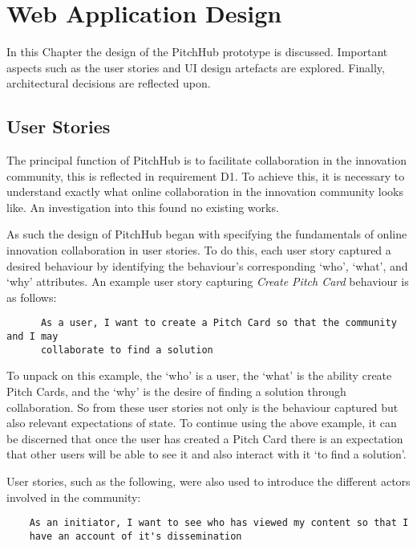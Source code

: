 
\chapter{Web Application Design}\label{C:design_web}

In this Chapter the design of the PitchHub prototype is discussed. Important aspects such as the user stories and UI design artefacts are explored. Finally, architectural decisions are reflected upon.

\section{User Stories}

The principal function of PitchHub is to facilitate collaboration in the innovation community, this is reflected in requirement D1. To achieve this, it is necessary to understand exactly what online collaboration in the innovation community looks like. An investigation into this found no existing works. 

As such the design of PitchHub began with specifying the fundamentals of online innovation collaboration in user stories. To do this, each user story captured a desired behaviour by identifying the behaviour's corresponding `who', `what', and `why' attributes. An example user story capturing \textit{Create Pitch Card} behaviour is as follows:

\begin{verbatim}
	  As a user, I want to create a Pitch Card so that the community and I may 
	  collaborate to find a solution	
\end{verbatim}

To unpack on this example, the `who' is a user, the `what' is the ability create Pitch Cards, and the `why' is the desire of finding a solution through collaboration.
So from these user stories not only is the behaviour captured but also relevant expectations of state. To continue using the above example, it can be discerned that once the user has created a Pitch Card there is an expectation that other users will be able to see it and also interact with it `to find a solution'. 

User stories, such as the following, were also used to introduce the different actors involved in the community:

\begin{verbatim}
    As an initiator, I want to see who has viewed my content so that I 
    have an account of it's dissemination
\end{verbatim}

